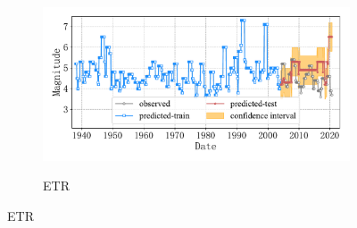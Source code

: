 \begin{figure}[!htbp]
\begin{subfigure}[b]{0.45\textwidth}
    \vspace{-1cm}
    \label{fig:seism_knn_minyear_1932_maxyear_2021_spanlat_2_spanlon_4_timewindow_72_nextmonth_12_minmag_3.0_block_3}
  \end{subfigure}
  ~
  \begin{subfigure}[b]{0.45\textwidth}
    \caption{ETR}
    \vspace{-0.2cm}
    \includegraphics[width=\textwidth]{Img/chap5_seism/block3/seism_etr_minyear_1932_maxyear_2021_spanlat_2_spanlon_4_timewindow_72_nextmonth_12_minmag_3.0_block_3.pdf}
    \vspace{-1cm}
    \label{fig:seism_etr_minyear_1932_maxyear_2021_spanlat_2_spanlon_4_timewindow_72_nextmonth_12_minmag_3.0_block_3}
  \end{subfigure}
  \label{fig:seism_minyear_1932_maxyear_2021_spanlat_2_spanlon_4_timewindow_72_nextmonth_12_minmag_3.0_block_3}
\end{figure}

